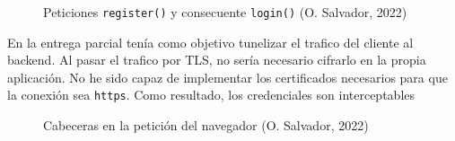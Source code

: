 \documentclass[11pt]{article}
\begin{document}
\begin{flushleft}
		\begin{figure}[htb]
			\centering
			\caption{Peticiones \texttt{register()} y consecuente \texttt{login()} (O. Salvador, 2022)}
		\end{figure}
	
	En la entrega parcial tenía como objetivo tunelizar el trafico del cliente al backend. Al pasar el trafico por TLS, no sería necesario cifrarlo en la propia aplicación. No he sido capaz de implementar los certificados necesarios para que la conexión sea \texttt{https}. Como resultado, los credenciales son interceptables
	\linebreak
	
	\begin{figure}[htb]
		\centering
		\caption{Cabeceras en la petición del navegador (O. Salvador, 2022)}
	\end{figure}
	

\end{flushleft}
\end{document}
